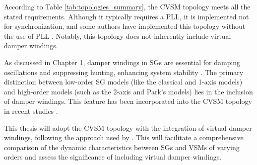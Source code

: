 According to Table \ref{tab:topologies_summary}, the CVSM topology meets all the
stated requirements. Although it typically requires a PLL, it is implemented not
for synchronization, and some authors have implemented this topology without the
use of PLL \cite{tayyebi2020power}. Notably, this topology does not inherently
include virtual damper windings.

As discussed in Chapter 1, damper windings in SGs are essential for damping
oscillations and suppressing hunting, enhancing system stability
\cite{kundur2022power,sauer2017power}. The primary distinction between low-order
SG models (like the classical and 1-axis models) and high-order models (such as
the 2-axis and Park's models) lies in the inclusion of damper windings. This
feature has been incorporated into the CVSM topology in recent studies
\cite{ma2017vsg,zhang2013vsm}.

This thesis will adopt the CVSM topology with the integration of virtual damper
windings, following the approach used by \cite{ma2017vsg,zhang2013vsm}. This
will facilitate a comprehensive comparison of the dynamic characteristics
between SGs and VSMs of varying orders and assess the significance of including
virtual damper windings.

